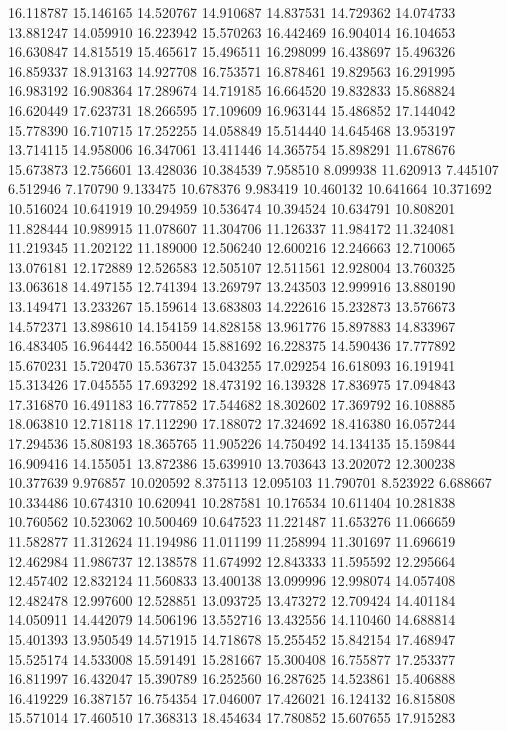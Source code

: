 16.118787
15.146165
14.520767
14.910687
14.837531
14.729362
14.074733
13.881247
14.059910
16.223942
15.570263
16.442469
16.904014
16.104653
16.630847
14.815519
15.465617
15.496511
16.298099
16.438697
15.496326
16.859337
18.913163
14.927708
16.753571
16.878461
19.829563
16.291995
16.983192
16.908364
17.289674
14.719185
16.664520
19.832833
15.868824
16.620449
17.623731
18.266595
17.109609
16.963144
15.486852
17.144042
15.778390
16.710715
17.252255
14.058849
15.514440
14.645468
13.953197
13.714115
14.958006
16.347061
13.411446
14.365754
15.898291
11.678676
15.673873
12.756601
13.428036
10.384539
7.958510
8.099938
11.620913
7.445107
6.512946
7.170790
9.133475
10.678376
9.983419
10.460132
10.641664
10.371692
10.516024
10.641919
10.294959
10.536474
10.394524
10.634791
10.808201
11.828444
10.989915
11.078607
11.304706
11.126337
11.984172
11.324081
11.219345
11.202122
11.189000
12.506240
12.600216
12.246663
12.710065
13.076181
12.172889
12.526583
12.505107
12.511561
12.928004
13.760325
13.063618
14.497155
12.741394
13.269797
13.243503
12.999916
13.880190
13.149471
13.233267
15.159614
13.683803
14.222616
15.232873
13.576673
14.572371
13.898610
14.154159
14.828158
13.961776
15.897883
14.833967
16.483405
16.964442
16.550044
15.881692
16.228375
14.590436
17.777892
15.670231
15.720470
15.536737
15.043255
17.029254
16.618093
16.191941
15.313426
17.045555
17.693292
18.473192
16.139328
17.836975
17.094843
17.316870
16.491183
16.777852
17.544682
18.302602
17.369792
16.108885
18.063810
12.718118
17.112290
17.188072
17.324692
18.416380
16.057244
17.294536
15.808193
18.365765
11.905226
14.750492
14.134135
15.159844
16.909416
14.155051
13.872386
15.639910
13.703643
13.202072
12.300238
10.377639
9.976857
10.020592
8.375113
12.095103
11.790701
8.523922
6.688667
10.334486
10.674310
10.620941
10.287581
10.176534
10.611404
10.281838
10.760562
10.523062
10.500469
10.647523
11.221487
11.653276
11.066659
11.582877
11.312624
11.194986
11.011199
11.258994
11.301697
11.696619
12.462984
11.986737
12.138578
11.674992
12.843333
11.595592
12.295664
12.457402
12.832124
11.560833
13.400138
13.099996
12.998074
14.057408
12.482478
12.997600
12.528851
13.093725
13.473272
12.709424
14.401184
14.050911
14.442079
14.506196
13.552716
13.432556
14.110460
14.688814
15.401393
13.950549
14.571915
14.718678
15.255452
15.842154
17.468947
15.525174
14.533008
15.591491
15.281667
15.300408
16.755877
17.253377
16.811997
16.432047
15.390789
16.252560
16.287625
14.523861
15.406888
16.419229
16.387157
16.754354
17.046007
17.426021
16.124132
16.815808
15.571014
17.460510
17.368313
18.454634
17.780852
15.607655
17.915283
